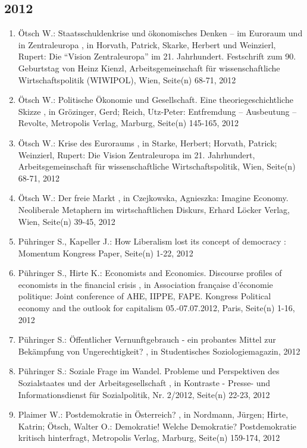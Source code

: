  \subsection*{2012} 
 \begin{enumerate}[leftmargin=*, labelsep=0.5cm] 
	 \item Ötsch W.:  Staatsschuldenkrise und ökonomisches Denken – im Euroraum und in Zentraleuropa  , in Horvath, Patrick, Skarke, Herbert  und Weinzierl, Rupert: Die “Vision Zentraleuropa” im 21. Jahrhundert. Festschrift zum 90. Geburtstag von Heinz Kienzl, Arbeitsgemeinschaft für wissenschaftliche Wirtschaftspolitik (WIWIPOL), Wien, Seite(n) 68-71, 2012
	 \item Ötsch W.:  Politische Ökonomie und Gesellschaft. Eine theoriegeschichtliche Skizze  , in Grözinger, Gerd; Reich, Utz-Peter: Entfremdung – Ausbeutung – Revolte, Metropolis Verlag, Marburg, Seite(n) 145-165, 2012
	 \item Ötsch W.:  Krise des Euroraums  , in Starke, Herbert; Horvath, Patrick; Weinzierl, Rupert: Die Vision Zentraleuropa im 21. Jahrhundert, Arbeitsgemeinschaft für wissenschaftliche Wirtschaftspolitik, Wien, Seite(n) 68-71, 2012
	 \item Ötsch W.:  Der freie Markt  , in Czejkowska, Agnieszka: Imagine Economy. Neoliberale Metaphern im wirtschaftlichen Diskurs, Erhard Löcker Verlag, Wien, Seite(n) 39-45, 2012
	 \item Pühringer S., Kapeller J.:  How Liberalism lost its concept of democracy  : Momentum Kongress Paper, Seite(n) 1-22, 2012
	 \item Pühringer S., Hirte K.:  Economists and Economics. Discourse profiles of economists in the financial crisis  , in Association française d'économie politique: Joint conference of AHE, IIPPE, FAPE. Kongress Political economy and the outlook for capitalism 05.-07.07.2012, Paris, Seite(n) 1-16, 2012
	 \item Pühringer S.:  Öffentlicher Vernunftgebrauch - ein probantes Mittel zur Bekämpfung von Ungerechtigkeit?  , in Studentisches Soziologiemagazin, 2012
	 \item Pühringer S.:  Soziale Frage im Wandel. Probleme und Perspektiven des Sozialstaates und der Arbeitsgesellschaft  , in Kontraste - Presse- und Informationsdienst für Sozialpolitik, Nr. 2/2012, Seite(n) 22-23, 2012
	 \item Plaimer W.:  Postdemokratie in Österreich?  , in Nordmann, Jürgen; Hirte, Katrin; Ötsch, Walter O.: Demokratie! Welche Demokratie? Postdemokratie kritisch hinterfragt, Metropolis Verlag, Marburg, Seite(n) 159-174, 2012

\end{enumerate}
